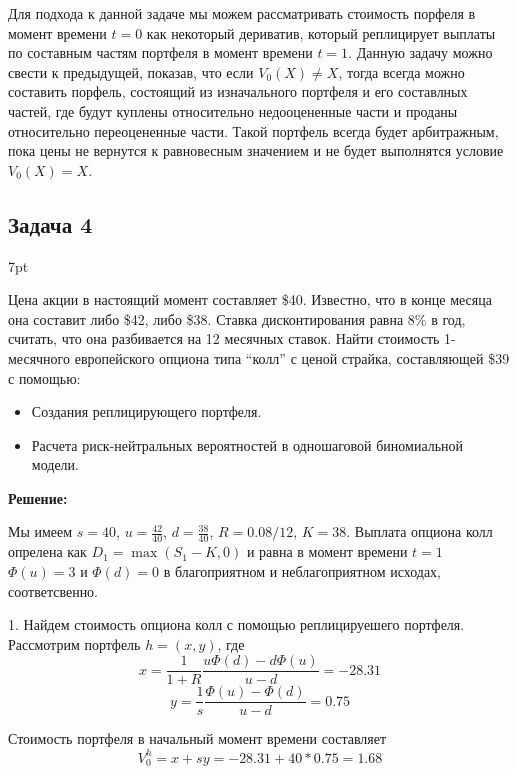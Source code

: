 \documentclass[a4paper,12pt]{article}
\newenvironment{formal}{%
	\def\FrameCommand{%
		\hspace{1pt}%
		{\color{black}\vrule width 1.5pt}%
		{\color{white}\vrule width 4pt}%
		\colorbox{white}%
	}%
	\MakeFramed{\advance\hsize-\width\FrameRestore}%
	\noindent\hspace{-4.55pt}%
	\begin{adjustwidth}{}{7pt}%
		\vspace{2pt}\vspace{2pt}%
	}
	{%
		\vspace{2pt}\end{adjustwidth}\endMakeFramed%
}
\begin{document}
Для подхода к данной задаче мы можем рассматривать стоимость порфеля в момент времени $t=0$ как некоторый дериватив, который реплицирует выплаты по составным частям портфеля в момент времени $t=1$. Данную задачу можно свести к предыдущей, показав, что если $V_0(X) \neq X$, тогда всегда можно составить порфель, состоящий из изначального портфеля и его составлных частей, где будут куплены относительно недооцененные части и проданы относительно переоцененные части. Такой портфель всегда будет арбитражным, пока цены не вернутся к равновесным значением и не будет выполнятся условие $V_0(X) = X$.


\subsection*{Задача 4}
\begin{formal}
Цена акции в настоящий момент составляет \$40. Известно, что в конце месяца она составит либо \$42, либо \$38. Ставка дисконтирования равна 8\% в год, считать, что она разбивается на 12 месячных ставок. Найти стоимость 1-месячного европейского опциона типа ``колл'' с ценой страйка, составляющей \$39 с помощью:
\begin{itemize}
	\item Создания реплицирующего портфеля.
	\item Расчета риск-нейтральных вероятностей в одношаговой биномиальной модели.
\end{itemize}
\end{formal}
\textbf{\large Решение:}

Мы имеем $s = 40$, $u = \frac{42}{40}$, $d = \frac{38}{40}$, $R = 0.08 / 12$, $K = 38$. Выплата опциона колл опрелена как $D_1 = \max(S_1 - K, 0)$ и равна в момент времени $t=1$ $\Phi(u) = 3$ и $\Phi(d) = 0$ в благоприятном и неблагоприятном исходах, соответсвенно.

1. Найдем стоимость опциона колл с помощью реплицируешего портфеля. Рассмотрим портфель $h = (x,y)$, где 
\begin{equation*}
	x = \frac{1}{1+R} \frac{u\Phi(d)-d\Phi(u)}{u-d} = -28.31
\end{equation*}
\begin{equation*}
	y = \frac{1}{s} \frac{\Phi(u)-\Phi(d)}{u-d} = 0.75
\end{equation*}

Стоимость портфеля в начальный момент времени составляет
\begin{equation*}
	V_0^h = x+sy = -28.31 + 40*0.75 = 1.68
\end{equation*}
\end{document}
